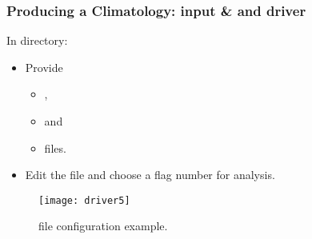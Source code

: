 
\begin{frame}
\frametitle{Producing a Climatology: input \& and driver}

\centerline{In  directory:}

\small{
\begin{itemize}
\item Provide
\begin{itemize}
\item[] ,
\item[]  and
\item[]  files.
\end{itemize}
\item Edit the  file and choose a flag number for analysis.
\end{itemize}
}

\begin{figure}
\centering
\texttt{[image: driver5]}
\caption{ file configuration example.}
\end{figure}

\end{frame}

